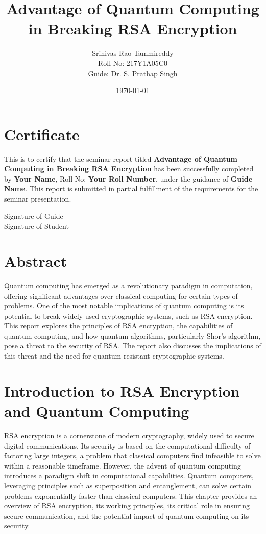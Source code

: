 \documentclass[12pt,a4paper]{report}
\title{Advantage of Quantum Computing in Breaking RSA Encryption}
\author{Srinivas Rao Tammireddy \\ Roll No: 217Y1A05C0 \\ Guide: Dr. S. Prathap Singh}
\date{\today}
\begin{document}
\maketitle

\chapter*{Certificate}
This is to certify that the seminar report titled \textbf{Advantage of Quantum Computing in Breaking RSA Encryption} has been successfully completed by \textbf{Your Name}, Roll No: \textbf{Your Roll Number}, under the guidance of \textbf{Guide Name}. This report is submitted in partial fulfillment of the requirements for the seminar presentation.

\vspace{2cm}
\begin{flushright}
Signature of Guide \\
Signature of Student
\end{flushright}

\newpage

\tableofcontents
\listoffigures
\newpage

\chapter*{Abstract}
Quantum computing has emerged as a revolutionary paradigm in computation, offering significant advantages over classical computing for certain types of problems. One of the most notable implications of quantum computing is its potential to break widely used cryptographic systems, such as RSA encryption. This report explores the principles of RSA encryption, the capabilities of quantum computing, and how quantum algorithms, particularly Shor's algorithm, pose a threat to the security of RSA\@. The report also discusses the implications of this threat and the need for quantum-resistant cryptographic systems.
\chapter{Introduction to RSA Encryption and Quantum Computing}
\label{chap:introduction}
\sloppy
RSA encryption is a cornerstone of modern cryptography, widely used to secure digital communications. Its security is based on the computational difficulty of factoring large integers, a problem that classical computers find infeasible to solve within a reasonable timeframe. However, the advent of quantum computing introduces a paradigm shift in computational capabilities. Quantum computers, leveraging principles such as superposition and entanglement, can solve certain problems exponentially faster than classical computers. This chapter provides an overview of RSA encryption, its working principles, its critical role in ensuring secure communication, and the potential impact of quantum computing on its security.
\end{document}
